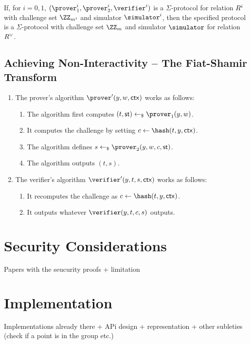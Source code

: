 \documentclass[runningheads]{llncs}
\begin{document}
\begin{theorem}
  If, for $i=0,1$, $(\prover_1^i,\prover_2^i,\verifier^i)$ is a $\Sigma$-protocol for relation $R^i$ with challenge set $\ZZ_{m^i}$ and simulator $\simulator^i$, then the specified protocol is a $\Sigma$-protocol with challenge set $\ZZ_m$ and simulator $\simulator$ for relation $R^\lor$.
\end{theorem}




\subsection{Achieving Non-Interactivity -- The Fiat-Shamir Transform}
\begin{enumerate}
  \item
    The prover's algorithm $\prover'(y,w,\ctx)$ works as follows:
    \begin{enumerate}
      \item
        The algorithm first computes $(t,\st)\getsr\prover_1(y,w)$.
      \item
        It computes the challenge by setting $c\gets\hash(t,y,\ctx)$.
      \item
        The algorithm defines $s\getsr\prover_2(y,w,c,\st)$.
      \item
        The algorithm outputs $(t,s)$.
    \end{enumerate}
  \item
    The verifier's algorithm $\verifier'(y,t,s,\ctx)$ works as follows:
    \begin{enumerate}
      \item
        It recomputes the challenge as $c\gets\hash(t,y,\ctx)$.
      \item
        It outputs whatever $\verifier(y,t,c,s)$ outputs.
    \end{enumerate}
\end{enumerate}

\section{Security Considerations}

Papers with the seucurity proofs + limitation


\section{Implementation}
Implementations already there + APi design + representation + other subleties (check if a point is in the group etc.)
\end{document}
